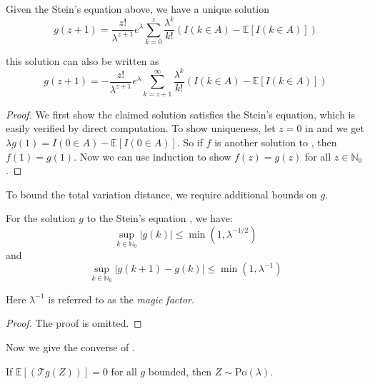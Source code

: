\documentclass{article}
\begin{document}
\begin{lemma}\label{lem:poisson_stein_equation}
    Given the Stein's equation above, we have a unique solution
    \begin{equation}
        g(z+1) = \frac{z!}{\lambda^{z+1}} e^\lambda \sum_{k=0}^z \frac{\lambda^k}{k!} (I(k\in A) - \mathbb{E}[I(k\in A)])
    \end{equation}

    this solution can also be written as 
    \begin{equation}
        g(z+1) = -\frac{z!}{\lambda^{z+1}} e^\lambda \sum_{k=z+1}^\infty \frac{\lambda^k}{k!} (I(k\in A) - \mathbb{E}[I(k\in A)])
    \end{equation}
\end{lemma}

\begin{proof}
    We first show the claimed solution satisfies the Stein's equation, which is easily verified by direct computation. To show uniqueness, let $z=0$ in  and we get $\lambda g(1) = I(0\in A) - \mathbb{E}[I(0\in A)]$. So if $f$ is another solution to , then $f(1)=g(1)$. Now we can use induction to show $f(z)=g(z)$ for all $z\in \mathbb{N}_0$.
\end{proof}

To bound the total variation distance, we require additional bounds on $g$.  

\begin{lemma}\label{lem:poisson_stein_bound}
For the solution $g$ to the Stein's equation , we have:
\begin{equation}
    \sup_{k \in \mathbb{N}_0} |g(k)| \leq \min (1, \lambda^{-1/2})
    \label{eq:poisson_stein_bound1}
\end{equation}
and 
\begin{equation}
    \sup_{k \in \mathbb{N}_0} |g(k+1) - g(k)| \leq \min (1, \lambda^{-1})
    \label{eq:poisson_stein_bound2}
\end{equation}

Here $\lambda^{-1}$ is referred to as the \textit{magic factor}.
\end{lemma}

\begin{proof}
    The proof is omitted.
\end{proof}

Now we give the converse of .

\begin{proposition}\label{prop: direction2 poisson}
    If $\mathbb{E}[(\mathcal{T}g(Z))]=0$ for all $g$ bounded, then $Z\sim \text{Po}(\lambda)$.
\end{proposition}
\end{document}
